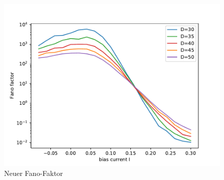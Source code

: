 \documentclass[12pt,a4paper]{article}
\begin{document}
\begin{figure}[H]
	\centering
	\includegraphics[scale=0.9]{fneurrealfast11jjem2shrealfast11jjem2strealfast19jjem2st.pdf}
	\caption{Neuer Fano-Faktor}
	\label{fano}
\end{figure}
\end{document}
